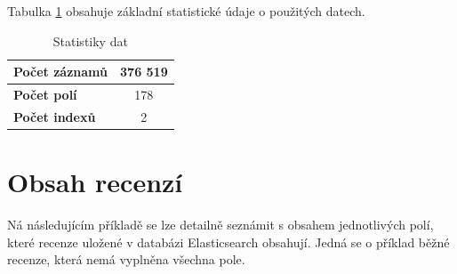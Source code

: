 \documentclass[czech,BP]{thesiskiv}
\begin{document}
Tabulka \ref{statistiky} obsahuje základní statistické údaje o použitých datech.

\begin{table}[h]
\centering
\begin{tabular}{l|c}
	
	\textbf{Počet záznamů} & 376 519 \\ \hline
	\textbf{Počet polí}    & 178     \\ 
	\textbf{Počet indexů}  & 2       \\ 
\end{tabular}
\caption{Statistiky dat}
\label{statistiky}
\end{table}

\section{Obsah recenzí}
Ná následujícím příkladě se lze detailně seznámit s obsahem jednotlivých polí, které recenze uložené v databázi Elasticsearch obsahují. Jedná se o příklad běžné recenze, která nemá vyplněna všechna pole.
\end{document}
